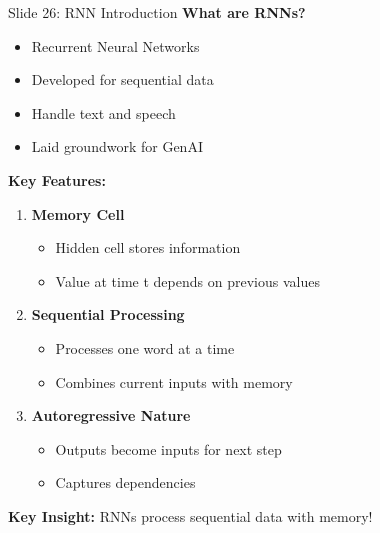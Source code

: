 \documentclass[8pt]{beamer}
\begin{document}
	\begin{frame}{Slide 26: RNN Introduction}
		\fontsize{6.5}{7.5}\selectfont
		\textbf{What are RNNs?}
		\begin{itemize}
			\item Recurrent Neural Networks
			\item Developed for sequential data
			\item Handle text and speech
			\item Laid groundwork for GenAI
		\end{itemize}
		
		\vspace{0.1cm}
		\textbf{Key Features:}
		\begin{enumerate}
			\item \textbf{Memory Cell}
			\begin{itemize}
				\item Hidden cell stores information
				\item Value at time t depends on previous values
			\end{itemize}
			\item \textbf{Sequential Processing}
			\begin{itemize}
				\item Processes one word at a time
				\item Combines current inputs with memory
			\end{itemize}
			\item \textbf{Autoregressive Nature}
			\begin{itemize}
				\item Outputs become inputs for next step
				\item Captures dependencies
			\end{itemize}
		\end{enumerate}
		
		\textcolor{myblue}{\textbf{Key Insight:}} RNNs process sequential data with memory!
	\end{frame}
	
\end{document}
